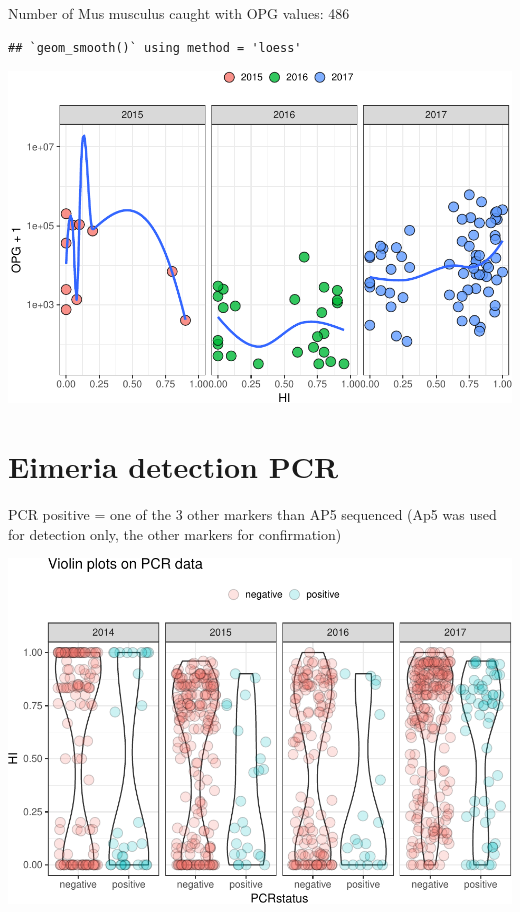\documentclass[]{article}
\begin{document}
Number of Mus musculus caught with OPG values: 486

\begin{verbatim}
## `geom_smooth()` using method = 'loess'
\end{verbatim}

\includegraphics{Data_Analysis_Alice_files/figure-latex/oocystssmooth-1.pdf}

\section{Eimeria detection PCR}\label{eimeria-detection-pcr}

PCR positive = one of the 3 other markers than AP5 sequenced (Ap5 was
used for detection only, the other markers for confirmation)

\includegraphics{Data_Analysis_Alice_files/figure-latex/pcr-1.pdf}
\end{document}
